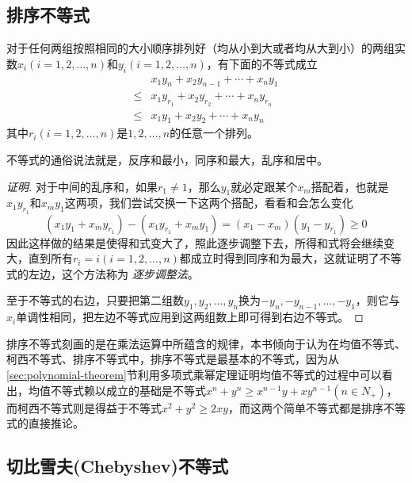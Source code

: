 \subsection{排序不等式}

\begin{theorem}[排序不等式]
  对于任何两组按照相同的大小顺序排列好（均从小到大或者均从大到小）的两组实数$x_i(i=1,2,\ldots,n)$和$y_i(i=1,2,\ldots,n)$，有下面的不等式成立
  \begin{eqnarray}
    \label{eq:rearrangement inequality}
    & x_1y_n+x_2y_{n-1}+\cdots+x_ny_1 \nonumber \\
    \leqslant & x_1y_{r_1}+x_2y_{r_2}+\cdots+x_ny_{r_n} \nonumber \\
    \leqslant & x_1y_1+x_2y_2+\cdots+x_ny_n
  \end{eqnarray}
  其中$r_i(i=1,2,\ldots,n)$是$1,2,\ldots,n$的任意一个排列。
\end{theorem}
不等式的通俗说法就是，反序和最小，同序和最大，乱序和居中。

\begin{proof}[证明]
  对于中间的乱序和，如果$r_1 \neq 1$，那么$y_1$就必定跟某个$x_m$搭配着，也就是$x_1y_{r_1}$和$x_my_1$这两项，我们尝试交换一下这两个搭配，看看和会怎么变化
  \begin{equation*}
    (x_1y_1+x_my_{r_1})-(x_1y_{r_1}+x_my_1) = (x_1-x_m)(y_1-y_{r_1}) \geqslant 0
  \end{equation*}
  因此这样做的结果是使得和式变大了，照此逐步调整下去，所得和式将会继续变大，直到所有$r_i=i(i=1,2,\ldots,n)$都成立时得到同序和为最大，这就证明了不等式的左边，这个方法称为 \emph{逐步调整法}。

  至于不等式的右边，只要把第二组数$y_1,y_2,\ldots,y_n$换为$-y_n,-y_{n-1},\ldots,-y_1$，则它与$x_i$单调性相同，把左边不等式应用到这两组数上即可得到右边不等式。
\end{proof}

排序不等式刻画的是在乘法运算中所蕴含的规律，本书倾向于认为在均值不等式、柯西不等式、排序不等式中，排序不等式是最基本的不等式，因为从\ref{sec:polynomial-theorem}节利用多项式乘幂定理证明均值不等式的过程中可以看出，均值不等式赖以成立的基础是不等式$x^n+y^n \geqslant x^{n-1}y+xy^{n-1}(n \in N_+)$，而柯西不等式则是得益于不等式$x^2+y^2 \geqslant 2xy$，而这两个简单不等式都是排序不等式的直接推论。

\subsection{切比雪夫(Chebyshev)不等式}

